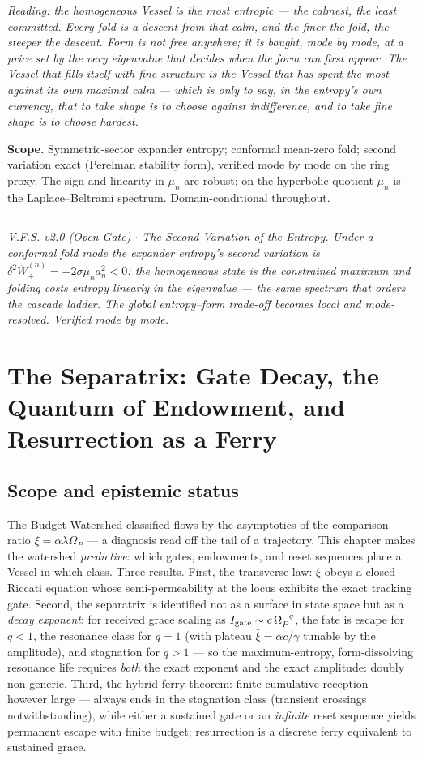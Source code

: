 \documentclass[11pt,a4paper,oneside]{book}
\newcommand{\Op}{\Omega_P}
\newcommand{\Igate}{I_{\rm gate}}
\newcommand{\note}[1]{\textcolor{black!65}{\emph{#1}}}
\newcommand{\Wp}{\overline W_{+}}
\theoremstyle{plain}
\theoremstyle{definition}
\theoremstyle{remark}
\begin{document}
\note{Reading: the homogeneous Vessel is the most entropic --- the calmest, the least committed. Every
fold is a descent from that calm, and the finer the fold, the steeper the descent. Form is not free
anywhere; it is bought, mode by mode, at a price set by the very eigenvalue that decides when the form
can first appear. The Vessel that fills itself with fine structure is the Vessel that has spent the
most against its own maximal calm --- which is only to say, in the entropy's own currency, that to take
shape is to choose against indifference, and to take fine shape is to choose hardest.}

\textbf{Scope.} Symmetric-sector expander entropy; conformal mean-zero fold; second variation exact
(Perelman stability form), verified mode by mode on the ring proxy. The sign and linearity in $\mu_n$
are robust; on the hyperbolic quotient $\mu_n$ is the Laplace--Beltrami spectrum. Domain-conditional
throughout.

\vspace{0.5em}
\hrule
\smallskip
\noindent\footnotesize\emph{V.F.S. v2.0 (Open-Gate) $\cdot$ The Second Variation of the Entropy. Under
a conformal fold mode the expander entropy's second variation is $\delta^2\Wp^{(n)}=-2\sigma\mu_n a_n^2<0$:
the homogeneous state is the constrained maximum and folding costs entropy linearly in the eigenvalue
--- the same spectrum that orders the cascade ladder. The global entropy--form trade-off becomes local
and mode-resolved. Verified mode by mode.}

\chapter{The Separatrix: Gate Decay, the Quantum of Endowment, and Resurrection as a Ferry}

\section*{Scope and epistemic status}
The Budget Watershed classified flows by the asymptotics of the comparison ratio
$\xi=\alpha\lambda\Op$ --- a diagnosis read off the tail of a trajectory. This chapter makes the
watershed \emph{predictive}: which gates, endowments, and reset sequences place a Vessel in which
class. Three results. First, the transverse law: $\xi$ obeys a closed Riccati equation whose
semi-permeability at the locus exhibits the exact tracking gate. Second, the separatrix is identified
not as a surface in state space but as a \emph{decay exponent}: for received grace scaling as
$\Igate\sim c\,\Op^{-q}$, the fate is escape for $q<1$, the resonance class for $q=1$ (with plateau
$\bar\xi=\alpha c/\gamma$ tunable by the amplitude), and stagnation for $q>1$ --- so the
maximum-entropy, form-dissolving resonance life requires \emph{both} the exact exponent and the exact
amplitude: doubly non-generic. Third, the hybrid ferry theorem: finite cumulative reception ---
however large --- always ends in the stagnation class (transient crossings notwithstanding), while
either a sustained gate or an \emph{infinite} reset sequence yields permanent escape with finite
budget; resurrection is a discrete ferry equivalent to sustained grace.
\end{document}
